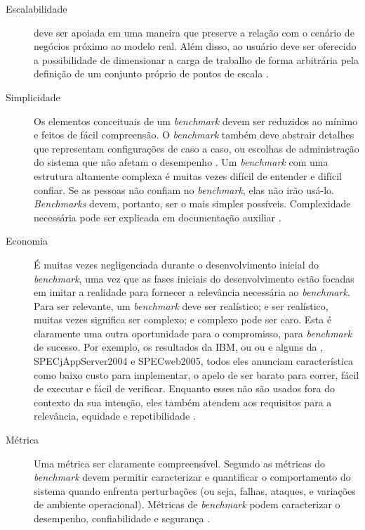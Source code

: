 \begin{description}
	\item[Escalabilidade] deve ser apoiada em uma maneira que preserve a relação com o cenário de negócios próximo ao modelo real. Além disso, ao usuário deve ser oferecido a possibilidade de dimensionar a carga de trabalho de forma arbitrária pela definição de um conjunto próprio de pontos de escala \cite{Marco2012}. 
	
	\item[Simplicidade] Os elementos conceituais de um \textit{benchmark} devem ser reduzidos ao mínimo e feitos de fácil compreensão. O \textit{benchmark} também deve abstrair detalhes que representam configurações de caso a caso, ou escolhas de administração do sistema que não afetam o desempenho \cite{Chen2014}. Um \textit{benchmark} com uma estrutura altamente complexa é muitas vezes difícil de entender e difícil confiar. Se as pessoas não confiam no \textit{benchmark}, elas não irão usá-lo. \textit{Benchmarks} devem, portanto, ser o mais simples possíveis. Complexidade necessária pode ser explicada em documentação auxiliar \cite{Weber2014}.
	
	\item[Economia] É muitas vezes negligenciada durante o desenvolvimento inicial do \textit{benchmark}, uma vez que as fases iniciais do desenvolvimento estão focadas em imitar a realidade para fornecer a relevância necessária ao \textit{benchmark}. Para ser relevante, um \textit{benchmark} deve ser realístico; e ser realístico, muitas vezes significa ser complexo; e complexo pode ser caro. Esta é claramente uma outra oportunidade para o compromisso, para \textit{benchmark} de sucesso. Por exemplo, os resultados da IBM,  ou   ou   e alguns da , SPECjAppServer2004 e  SPECweb2005, todos eles anunciam característica como baixo custo para implementar, o apelo de ser barato para correr, fácil de executar e fácil de verificar. Enquanto esses não são usados fora do contexto da sua intenção, eles também atendem aos requisitos para a relevância, equidade e repetibilidade \cite{Huppler2009}. 
	
	\item[Métrica] Uma métrica ser claramente compreensível. Segundo  as métricas do \textit{benchmark} devem permitir caracterizar e quantificar o comportamento do sistema quando enfrenta perturbações (ou seja, falhas, ataques, e variações de ambiente operacional). Métricas de \textit{benchmark} podem caracterizar o desempenho, confiabilidade e segurança \cite{Marco2012}.
	
\end{description}

